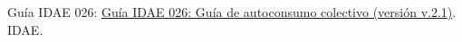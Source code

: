 \documentclass[a4paper,10pt,twocolumn]{article}
\begin{document}
\begin{Form}
\begin{thebibliography}{9}
		Guía IDAE 026: \href{https://www.idae.es/publicaciones/guia-de-autoconsumo-colectivo}{Guía IDAE 026: Guía de autoconsumo colectivo (versión v.2.1)}. IDAE.
	\end{thebibliography}








	\TextField[name=I0 ,width=0cm]{}
	\TextField[name=Bt,width=0cm]{}






\end{Form}
\end{document}
